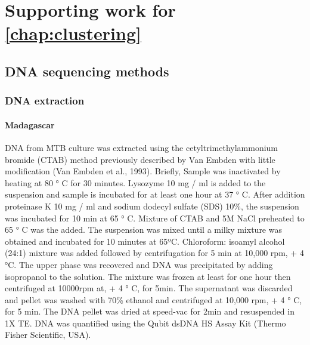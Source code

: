 \chapter{Supporting work for \autoref*{chap:clustering}}


\section{DNA sequencing methods}

\subsection{DNA extraction}

\subsubsection{Madagascar}


DNA from MTB culture was extracted using the cetyltrimethylammonium bromide (CTAB) method previously described by Van Embden with little modification (Van Embden et al., 1993). Briefly, Sample was inactivated by heating at 80 ° C for 30 minutes. Lysozyme 10 mg / ml is added to the suspension and sample is incubated for at least one hour at 37 ° C. After addition proteinase K 10 mg / ml and sodium dodecyl sulfate (SDS) 10\%, the suspension was incubated for 10 min at 65 ° C. Mixture of CTAB and 5M NaCl preheated to 65 ° C was the added. The suspension was mixed until a milky mixture was obtained and incubated for 10 minutes at 65ºC. Chloroform: isoamyl alcohol (24:1) mixture was added followed by centrifugation for 5 min at 10,000 rpm, + 4 °C. The upper phase was recovered and DNA was precipitated by adding isopropanol to the solution.  The mixture was frozen at least for one hour then centrifuged at 10000rpm at, + 4 ° C, for 5min.  The supernatant was discarded and pellet was washed with 70\% ethanol and centrifuged at 10,000 rpm, + 4 ° C, for 5 min. The DNA pellet was dried at speed-vac for 2min and resuspended in 1X TE. DNA was quantified using the Qubit dsDNA HS Assay Kit (Thermo Fisher Scientific, USA).


